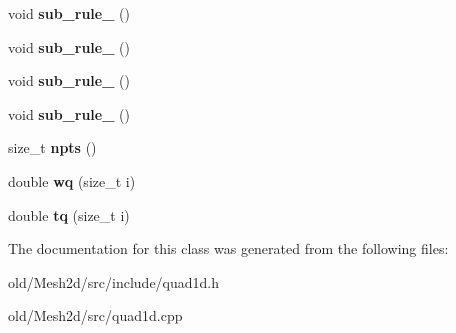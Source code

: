 \begin{DoxyCompactItemize}
void {\bfseries sub\+\_\+rule\+\_} ()
\item 
\mbox{\label{classMeshFramework2D_1_1LegendreGauss_a50b4238c7cade3272efe46641e1d2d3f}} 
void {\bfseries sub\+\_\+rule\+\_} ()
\item 
\mbox{\label{classMeshFramework2D_1_1LegendreGauss_ae6a8077dd8cf9fc76ed1234b93691049}} 
void {\bfseries sub\+\_\+rule\+\_} ()
\item 
\mbox{\label{classMeshFramework2D_1_1LegendreGauss_aad37934da18110fd078f1950a575fd3d}} 
void {\bfseries sub\+\_\+rule\+\_} ()
\item 
\mbox{\label{classMeshFramework2D_1_1LegendreGauss_a1251635135ab00a28e128a058288e440}} 
size\+\_\+t {\bfseries npts} ()
\item 
\mbox{\label{classMeshFramework2D_1_1LegendreGauss_a2800eb7a7c2648b1edb77231ef42608a}} 
double {\bfseries wq} (size\+\_\+t i)
\item 
\mbox{\label{classMeshFramework2D_1_1LegendreGauss_aa10e032f4ea04323773b23177b4124ee}} 
double {\bfseries tq} (size\+\_\+t i)
\end{DoxyCompactItemize}


The documentation for this class was generated from the following files\+:\begin{DoxyCompactItemize}
\item 
old/\+Mesh2d/src/include/quad1d.\+h\item 
old/\+Mesh2d/src/quad1d.\+cpp\end{DoxyCompactItemize}
